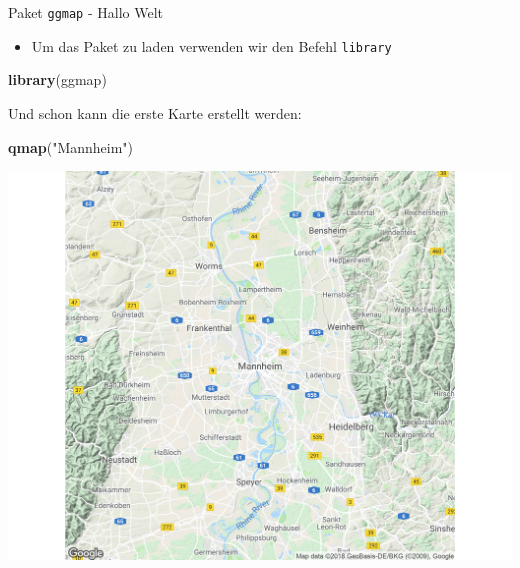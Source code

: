 \documentclass[ignorenonframetext,]{beamer}
\newenvironment{Shaded}{\begin{snugshade}}{\end{snugshade}}
\newcommand{\KeywordTok}[1]{\textcolor[rgb]{0.26,0.66,0.93}{\textbf{#1}}}
\newcommand{\NormalTok}[1]{\textcolor[rgb]{0.74,0.68,0.62}{#1}}
\newcommand{\StringTok}[1]{\textcolor[rgb]{0.02,0.61,0.04}{#1}}
\providecommand{\tightlist}{%
  \setlength{\itemsep}{0pt}\setlength{\parskip}{0pt}}
\begin{document}
\begin{frame}[fragile]{Paket \texttt{ggmap} - Hallo Welt}
\protect\hypertarget{paket-ggmap---hallo-welt}{}

\begin{itemize}
\tightlist
\item
  Um das Paket zu laden verwenden wir den Befehl \texttt{library}
\end{itemize}

\begin{Shaded}
\begin{Highlighting}[]
\KeywordTok{library}\NormalTok{(ggmap)}
\end{Highlighting}
\end{Shaded}

Und schon kann die erste Karte erstellt werden:

\begin{Shaded}
\begin{Highlighting}[]
\KeywordTok{qmap}\NormalTok{(}\StringTok{"Mannheim"}\NormalTok{)}
\end{Highlighting}
\end{Shaded}

\includegraphics{figure/Mannheim_ggmap.pdf}

\end{frame}
\end{document}
